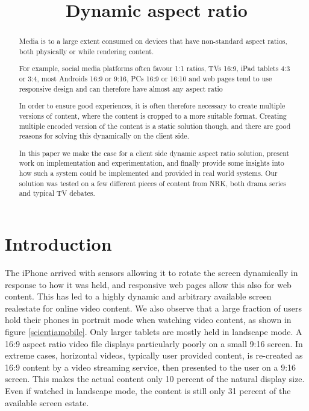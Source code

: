 \documentclass[sigconf, review=true]{acmart}
\title{Dynamic aspect ratio}
\begin{document}

 
\begin{abstract}


Media is to a large extent consumed on devices that have non-standard aspect
ratios, both physically or while rendering content. 

For example, social media platforms often favour 1:1 ratios, TVs 16:9, iPad
tablets 4:3 or 3:4, most Androids 16:9 or 9:16, PCs 16:9 or 16:10 and web
pages tend to use responsive design and can therefore have almost any aspect
ratio

In order to ensure good experiences, it is often therefore necessary to create
multiple versions of content, where the content is cropped to a more suitable
format. Creating multiple encoded version of the content is a static solution
though, and there are good reasons for solving this dynamically on the client
side. 

In this paper we make the case for a client side dynamic aspect ratio
solution, present work on implementation and experimentation, and finally
provide some insights into how such a system could be implemented and
provided in real world systems. Our solution was tested on a few different
pieces of content from NRK, both drama series and typical TV debates.

\end{abstract}

\maketitle

\section{Introduction}\label{introduction}

The iPhone arrived with sensors allowing it to rotate the screen dynamically
in response to how it was held, and responsive web pages allow this also for
web content. This has led to a highly dynamic and arbitrary available screen
realestate for online video content. We also observe that a large fraction of
users hold their phones in portrait mode when watching video content, as
shown in figure \ref{scientiamobile}. Only larger tablets are mostly held in
landscape mode. A 16:9 aspect ratio video file displays particularly poorly
on a small 9:16 screen. In extreme cases, horizontal videos, typically user
provided content, is re-created as 16:9 content by a video streaming service,
then presented to the user on a 9:16 screen. This makes the actual content
only 10 percent of the natural display size. Even if watched in landscape
mode, the content is still only 31 percent of the available screen estate. 
\end{document}
